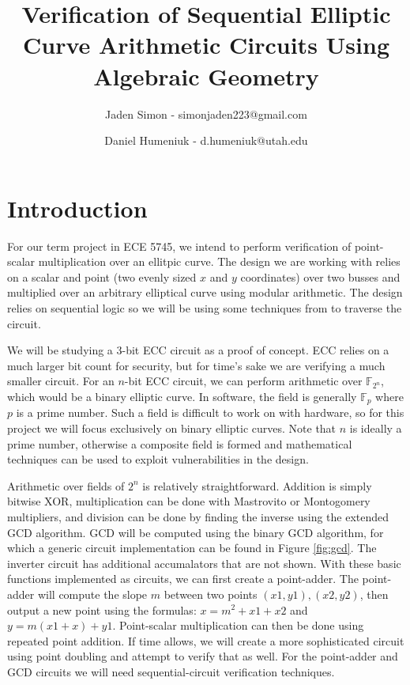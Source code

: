 \documentclass[12pt]{report}
\title{Verification of Sequential Elliptic Curve Arithmetic Circuits Using Algebraic Geometry}
\author{Jaden Simon - simonjaden223@gmail.com \\ \and
	   Daniel Humeniuk - d.humeniuk@utah.edu}
\begin{document}
\maketitle

\section{Introduction}

For our term project in ECE 5745, we intend to perform verification of point-scalar multiplication over an ellitpic curve. The design we are working with relies on a scalar and point (two evenly sized $x$ and $y$ coordinates) over two busses and multiplied over an arbitrary elliptical curve using modular arithmetic. The design relies on sequential logic so we will be using some techniques from \cite{Kalla} to traverse the circuit.

We will be studying a 3-bit ECC circuit as a proof of concept. ECC relies on a much larger bit count for security, but for time's sake we are verifying a much smaller circuit. For an $n$-bit ECC circuit, we can perform arithmetic over $\mathbb{F}_{2^n}$, which would be a binary elliptic curve. In software, the field is generally $\mathbb{F}_{p}$ where $p$ is a prime number. Such a field is difficult to work on with hardware, so for this project we will focus exclusively on binary elliptic curves. Note that $n$ is ideally a prime number, otherwise a composite field is formed and mathematical techniques can be used to exploit vulnerabilities in the design. 

Arithmetic over fields of $2^n$ is relatively straightforward. Addition is simply bitwise XOR, multiplication can be done with Mastrovito or Montogomery multipliers, and division can be done by finding the inverse using the extended GCD algorithm. GCD will be computed using the binary GCD algorithm, for which a generic circuit implementation can be found in Figure \ref{fig:gcd}. The inverter circuit has additional accumalators that are not shown. With these basic functions implemented as circuits, we can first create a point-adder. The point-adder will compute the slope $m$ between two points $(x1, y1), (x2, y2)$, then output a new point using the formulas: $x = m^2 + x1 + x2$ and $y = m(x1 + x) + y1$. Point-scalar multiplication can then be done using repeated point addition. If time allows, we will create a more sophisticated circuit using point doubling and attempt to verify that as well. For the point-adder and GCD circuits we will need sequential-circuit verification techniques. 
\end{document}
